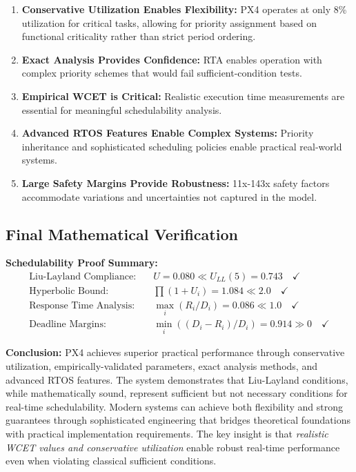\documentclass[12pt,a4paper]{article}
\begin{document}
\begin{enumerate}
\item \textbf{Conservative Utilization Enables Flexibility:} PX4 operates at only 8\% utilization for critical tasks, allowing for priority assignment based on functional criticality rather than strict period ordering.

\item \textbf{Exact Analysis Provides Confidence:} RTA enables operation with complex priority schemes that would fail sufficient-condition tests.

\item \textbf{Empirical WCET is Critical:} Realistic execution time measurements are essential for meaningful schedulability analysis.

\item \textbf{Advanced RTOS Features Enable Complex Systems:} Priority inheritance and sophisticated scheduling policies enable practical real-world systems.

\item \textbf{Large Safety Margins Provide Robustness:} 11x-143x safety factors accommodate variations and uncertainties not captured in the model.
\end{enumerate}

\subsection{Final Mathematical Verification}

\textbf{Schedulability Proof Summary:}
\begin{align}
\text{Liu-Layland Compliance:} \quad & U = 0.080 \ll U_{LL}(5) = 0.743 \quad \checkmark \\
\text{Hyperbolic Bound:} \quad & \prod(1 + U_i) = 1.084 \ll 2.0 \quad \checkmark \\
\text{Response Time Analysis:} \quad & \max_i(R_i/D_i) = 0.086 \ll 1.0 \quad \checkmark \\
\text{Deadline Margins:} \quad & \min_i((D_i - R_i)/D_i) = 0.914 \gg 0 \quad \checkmark
\end{align}

\textbf{Conclusion:} PX4 achieves superior practical performance through conservative utilization, empirically-validated parameters, exact analysis methods, and advanced RTOS features. The system demonstrates that Liu-Layland conditions, while mathematically sound, represent sufficient but not necessary conditions for real-time schedulability. Modern systems can achieve both flexibility and strong guarantees through sophisticated engineering that bridges theoretical foundations with practical implementation requirements. The key insight is that \emph{realistic WCET values and conservative utilization} enable robust real-time performance even when violating classical sufficient conditions.
\end{document}
